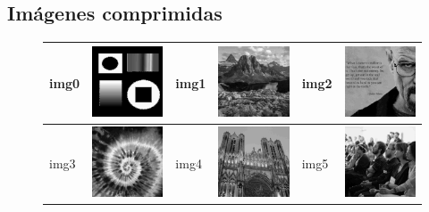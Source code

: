 \documentclass{article}
\begin{document}
\newpage
\subsection{Imágenes comprimidas}

\begin{figure}[!htp]
\begin{center}
\begin{tabular}[t]{|ll|ll|ll|}
\hline
img0 & \includegraphics[width=3cm]{../imgs/output/gray_8_50_2000/img00.png} &
img1 & \includegraphics[width=3cm]{../imgs/output/gray_8_50_2000/img01.png} &
img2 & \includegraphics[width=3cm]{../imgs/output/gray_8_50_2000/img02.png} \\
\hline
img3 & \includegraphics[width=3cm]{../imgs/output/gray_8_50_2000/img03.png} &
img4 & \includegraphics[width=3cm]{../imgs/output/gray_8_50_2000/img04.png} &
img5 & \includegraphics[width=3cm]{../imgs/output/gray_8_50_2000/img05.png} \\

\end{tabular}
\end{center}
\end{figure}
\end{document}
